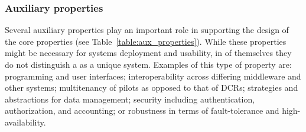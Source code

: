 \documentclass{sig-alternate}
\begin{document}
\begin{itemize}

\end{itemize}

\subsubsection{Auxiliary properties}
\label{sec:auxprops}

Several auxiliary properties play an important role in supporting the design of
the core properties (see Table~\ref{table:aux_properties}). While these
properties might be necessary for \pilot systems deployment and usability, in of
themselves they do not distinguish a \pilot as a unique system. Examples of this
type of property are: programming and user interfaces; interoperability across
differing middleware and other \pilot systems; multitenancy of pilots as opposed
to that of DCRs; strategies and abstractions for data management; security
including authentication, authorization, and accounting; or robustness in terms
of fault-tolerance and high-availability.
\end{document}
